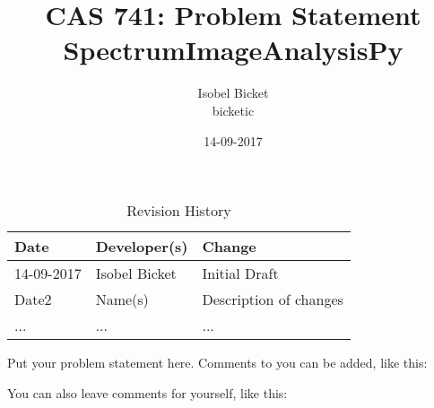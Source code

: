 \documentclass{article}
\title{CAS 741: Problem Statement\\SpectrumImageAnalysisPy}
\author{Isobel Bicket\\bicketic}
\date{14-09-2017}
\begin{document}
\maketitle

\begin{table}[hp]
\caption{Revision History} \label{TblRevisionHistory}
\begin{tabularx}{\textwidth}{llX}
\toprule
\textbf{Date} & \textbf{Developer(s)} & \textbf{Change}\\
\midrule
14-09-2017 & Isobel Bicket & Initial Draft\\
Date2 & Name(s) & Description of changes\\
... & ... & ...\\
\bottomrule
\end{tabularx}
\end{table}

Put your problem statement here.  Comments to you can be added, like this:


You can also leave comments for yourself, like this:

\end{document}
